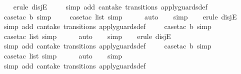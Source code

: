 \begin{isabellebody}
\ \ \isamarkupfalse%
\ {\isacharparenleft}erule\ disjE{\isacharparenright}\isanewline
\ \ \ \isamarkupfalse%
\ {\isacharparenleft}simp\ add{\isacharcolon}\ can{\isacharunderscore}take\ transitions\ apply{\isacharunderscore}guards{\isacharunderscore}def{\isacharparenright}\isanewline
\ \ \ \isamarkupfalse%
\ {\isacharparenleft}case{\isacharunderscore}tac\ b{\isacharcomma}\ simp{\isacharparenright}\isanewline
\ \ \ \isamarkupfalse%
\ {\isacharparenleft}case{\isacharunderscore}tac\ list{\isacharcomma}\ simp{\isacharparenright}\isanewline
\ \ \ \ \isamarkupfalse%
\ auto{\isacharbrackleft}{}{\isacharbrackright}\isanewline
\ \ \isamarkupfalse%
\ simp\isanewline
\ \ \isamarkupfalse%
\ {\isacharparenleft}erule\ disjE{\isacharparenright}\isanewline
\ \ \ \isamarkupfalse%
\ {\isacharparenleft}simp\ add{\isacharcolon}\ can{\isacharunderscore}take\ transitions\ apply{\isacharunderscore}guards{\isacharunderscore}def{\isacharparenright}\isanewline
\ \ \ \isamarkupfalse%
\ {\isacharparenleft}case{\isacharunderscore}tac\ b{\isacharcomma}\ simp{\isacharparenright}\isanewline
\ \ \ \isamarkupfalse%
\ {\isacharparenleft}case{\isacharunderscore}tac\ list{\isacharcomma}\ simp{\isacharparenright}\isanewline
\ \ \ \ \isamarkupfalse%
\ auto{\isacharbrackleft}{}{\isacharbrackright}\isanewline
\ \ \isamarkupfalse%
\ simp\isanewline
\ \ \isamarkupfalse%
\ {\isacharparenleft}erule\ disjE{\isacharparenright}\isanewline
\ \ \ \isamarkupfalse%
\ {\isacharparenleft}simp\ add{\isacharcolon}\ can{\isacharunderscore}take\ transitions\ apply{\isacharunderscore}guards{\isacharunderscore}def{\isacharparenright}\isanewline
\ \ \ \isamarkupfalse%
\ {\isacharparenleft}case{\isacharunderscore}tac\ b{\isacharcomma}\ simp{\isacharparenright}\isanewline
\ \ \ \isamarkupfalse%
\ {\isacharparenleft}case{\isacharunderscore}tac\ list{\isacharcomma}\ simp{\isacharparenright}\isanewline
\ \ \ \ \isamarkupfalse%
\ auto{\isacharbrackleft}{}{\isacharbrackright}\isanewline
\ \ \isamarkupfalse%
\ simp\isanewline
\ \ \ \isamarkupfalse%
\ {\isacharparenleft}simp\ add{\isacharcolon}\ can{\isacharunderscore}take\ transitions\ apply{\isacharunderscore}guards{\isacharunderscore}def{\isacharparenright}\isanewline
\ \ \ \isamarkupfalse%

\end{isabellebody}
